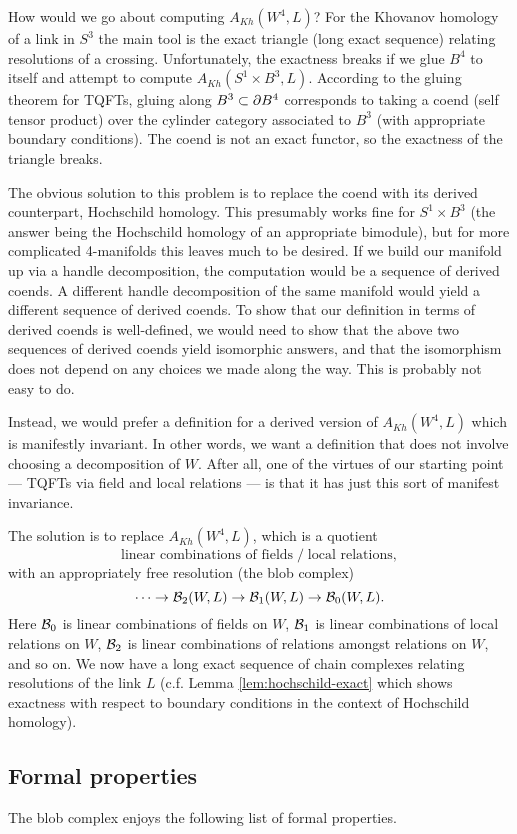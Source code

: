 How would we go about computing $A_{Kh}(W^4, L)$?
For the Khovanov homology of a link in $S^3$ the main tool is the exact triangle (long exact sequence)
relating resolutions of a crossing.
Unfortunately, the exactness breaks if we glue $B^4$ to itself and attempt
to compute $A_{Kh}(S^1\times B^3, L)$.
According to the gluing theorem for TQFTs, gluing along $B^3 \subset \partial B^4$
corresponds to taking a coend (self tensor product) over the cylinder category
associated to $B^3$ (with appropriate boundary conditions).
The coend is not an exact functor, so the exactness of the triangle breaks.

The obvious solution to this problem is to replace the coend with its derived counterpart, 
Hochschild homology.
This presumably works fine for $S^1\times B^3$ (the answer being the Hochschild homology
of an appropriate bimodule), but for more complicated 4-manifolds this leaves much to be desired.
If we build our manifold up via a handle decomposition, the computation
would be a sequence of derived coends.
A different handle decomposition of the same manifold would yield a different
sequence of derived coends.
To show that our definition in terms of derived coends is well-defined, we
would need to show that the above two sequences of derived coends yield 
isomorphic answers, and that the isomorphism does not depend on any
choices we made along the way.
This is probably not easy to do.

Instead, we would prefer a definition for a derived version of $A_{Kh}(W^4, L)$
which is manifestly invariant.
In other words, we want a definition that does not
involve choosing a decomposition of $W$.
After all, one of the virtues of our starting point --- TQFTs via field and local relations ---
is that it has just this sort of manifest invariance.

The solution is to replace $A_{Kh}(W^4, L)$, which is a quotient
\[
 \text{linear combinations of fields} \;\big/\; \text{local relations} ,
\]
with an appropriately free resolution (the blob complex)
\[
	\cdots\to {\mathcal B}_2(W, L) \to {\mathcal B}_1(W, L) \to {\mathcal B}_0(W, L) .
\]
Here ${\mathcal B}_0$ is linear combinations of fields on $W$,
${\mathcal B}_1$ is linear combinations of local relations on $W$,
${\mathcal B}_2$ is linear combinations of relations amongst relations on $W$,
and so on. 
We now have a long exact sequence of chain complexes relating resolutions of the link $L$ 
(c.f. Lemma \ref{lem:hochschild-exact} which shows exactness 
with respect to boundary conditions in the context of Hochschild homology).


\subsection{Formal properties}
\label{sec:properties}
The blob complex enjoys the following list of formal properties.

